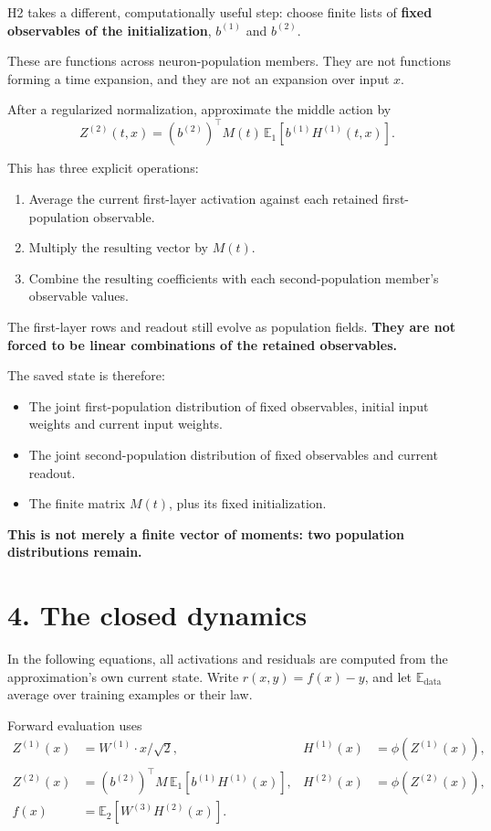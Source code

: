 \documentclass[11pt,a4paper]{scrartcl}
\begin{document}
H2 takes a different, computationally useful step: choose finite lists of \textbf{fixed observables of the initialization}, \(b^{(1)}\) and \(b^{(2)}\).

These are functions across neuron-population members. They are not functions forming a time expansion, and they are not an expansion over input \(x\).

After a regularized normalization, approximate the middle action by
\[
Z^{(2)}(t,x)
=
(b^{(2)})^\top M(t)\,
\mathbb E_1[b^{(1)}H^{(1)}(t,x)].
\]

This has three explicit operations:
\begin{enumerate}
\item Average the current first-layer activation against each retained first-population observable.
\item Multiply the resulting vector by \(M(t)\).
\item Combine the resulting coefficients with each second-population member’s observable values.
\end{enumerate}

The first-layer rows and readout still evolve as population fields. \textbf{They are not forced to be linear combinations of the retained observables.}

The saved state is therefore:
\begin{itemize}
\item The joint first-population distribution of fixed observables, initial input weights and current input weights.
\item The joint second-population distribution of fixed observables and current readout.
\item The finite matrix \(M(t)\), plus its fixed initialization.
\end{itemize}

\textbf{This is not merely a finite vector of moments: two population distributions remain.}

\section{4. The closed dynamics}

In the following equations, all activations and residuals are computed from the approximation’s own current state. Write \(r(x,y)=f(x)-y\), and let \(\mathbb E_{\mathrm{data}}\) average over training examples or their law.

Forward evaluation uses
\[
\begin{aligned}
Z^{(1)}(x)&=W^{(1)}\cdot x/\sqrt2,
& H^{(1)}(x)&=\phi(Z^{(1)}(x)),\\
Z^{(2)}(x)&=(b^{(2)})^\top M\,\mathbb E_1[b^{(1)}H^{(1)}(x)],
& H^{(2)}(x)&=\phi(Z^{(2)}(x)),\\
f(x)&=\mathbb E_2[W^{(3)}H^{(2)}(x)].
\end{aligned}
\]
\end{document}

